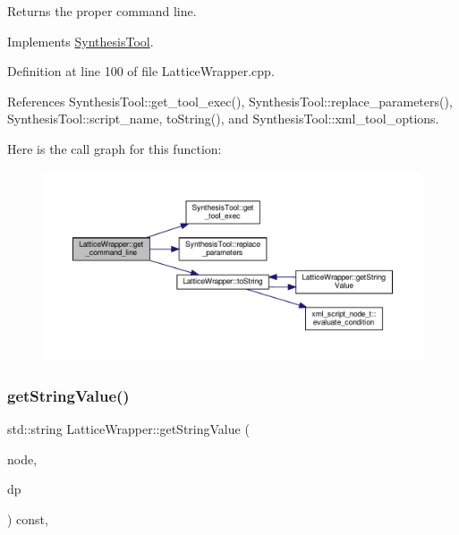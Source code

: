 Returns the proper command line. 



Implements \hyperlink{classSynthesisTool_a8eb2ef7a6230a997a2467d298613c045}{Synthesis\+Tool}.



Definition at line 100 of file Lattice\+Wrapper.\+cpp.



References Synthesis\+Tool\+::get\+\_\+tool\+\_\+exec(), Synthesis\+Tool\+::replace\+\_\+parameters(), Synthesis\+Tool\+::script\+\_\+name, to\+String(), and Synthesis\+Tool\+::xml\+\_\+tool\+\_\+options.

Here is the call graph for this function\+:
\nopagebreak
\begin{figure}[H]
\begin{center}
\leavevmode
\includegraphics[width=350pt]{d4/d55/classLatticeWrapper_ae568633c4a822e32b6ca75f9c12bf141_cgraph}
\end{center}
\end{figure}
\mbox{\label{classLatticeWrapper_a93a496eef88f096b8405503966a15a2d}} 
\subsubsection{\texorpdfstring{get\+String\+Value()}{getStringValue()}}
{\footnotesize\ttfamily std\+::string Lattice\+Wrapper\+::get\+String\+Value (\begin{DoxyParamCaption}\item[{const \hyperlink{xml__script__command_8hpp_a1fe3d50ade66bc35e41be9b68bbbcd02}{xml\+\_\+script\+\_\+node\+\_\+t\+Ref}}]{node,  }\item[{const \hyperlink{DesignParameters_8hpp_ae36bb1c4c9150d0eeecfe1f96f42d157}{Design\+Parameters\+Ref} \&}]{dp }\end{DoxyParamCaption}) const\hspace{0.3cm}{\ttfamily [override]}, {\ttfamily [virtual]}}



